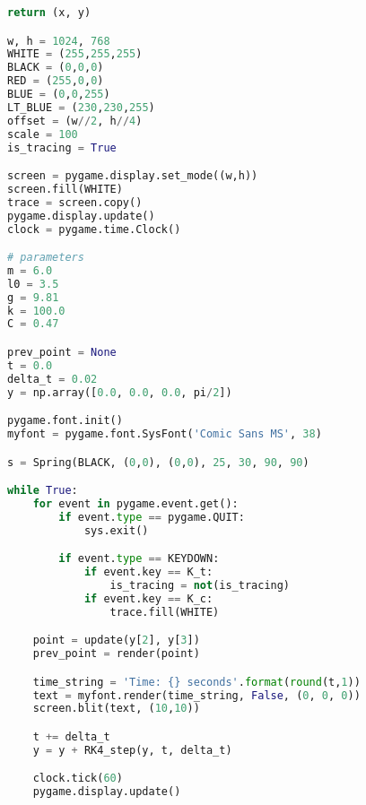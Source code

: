 \begin{lstlisting}[language=Python, caption=\textit{Path Animation Python Script for system \textbf{with} Damping}]
	return (x, y)

w, h = 1024, 768
WHITE = (255,255,255)
BLACK = (0,0,0)
RED = (255,0,0)
BLUE = (0,0,255)
LT_BLUE = (230,230,255)
offset = (w//2, h//4)
scale = 100
is_tracing = True

screen = pygame.display.set_mode((w,h))
screen.fill(WHITE)
trace = screen.copy()
pygame.display.update()
clock = pygame.time.Clock()

# parameters
m = 6.0
l0 = 3.5
g = 9.81
k = 100.0
C = 0.47

prev_point = None
t = 0.0
delta_t = 0.02
y = np.array([0.0, 0.0, 0.0, pi/2])

pygame.font.init()
myfont = pygame.font.SysFont('Comic Sans MS', 38)

s = Spring(BLACK, (0,0), (0,0), 25, 30, 90, 90)

while True:
	for event in pygame.event.get():
		if event.type == pygame.QUIT:
			sys.exit()

		if event.type == KEYDOWN:
			if event.key == K_t:
				is_tracing = not(is_tracing)
			if event.key == K_c:
				trace.fill(WHITE)

	point = update(y[2], y[3])
	prev_point = render(point)

	time_string = 'Time: {} seconds'.format(round(t,1))
	text = myfont.render(time_string, False, (0, 0, 0))
	screen.blit(text, (10,10))

	t += delta_t
	y = y + RK4_step(y, t, delta_t) 

	clock.tick(60)
	pygame.display.update()

\end{lstlisting}




